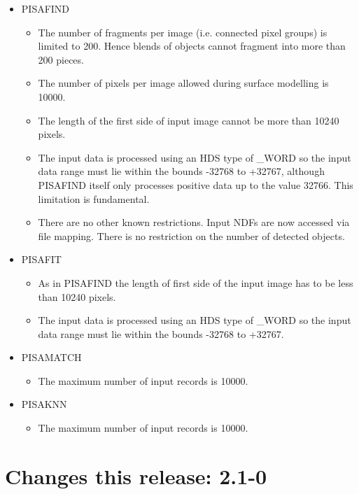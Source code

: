 \begin{itemize}
   \item PISAFIND
   \begin{itemize}
      \item The number of fragments per image (i.e. connected pixel groups)
            is limited to 200. Hence blends of objects cannot fragment into
            more than 200 pieces.
      \item The number of pixels per image allowed during surface modelling
            is 10000. 
      \item The length of the first side of input image cannot be more than
            10240 pixels.
      \item The input data is processed using an HDS type of \_WORD so the input
            data range must lie within the bounds -32768 to +32767,
            although PISAFIND itself only processes positive data up to
            the value 32766. This limitation is fundamental.
      \item There are no other known restrictions. Input NDFs are now accessed
            via file mapping. There is no restriction on the number of detected
            objects.
    \end{itemize}
    \item PISAFIT
    \begin{itemize}
       \item As in PISAFIND the length of first side of the input image
             has to be less than 10240 pixels.
       \item The input data is processed using an HDS type of \_WORD so the input
             data range must lie within the bounds -32768 to +32767.
    \end{itemize}
    \item PISAMATCH
    \begin{itemize}
       \item The maximum number of input records is 10000.
    \end{itemize}
    \item PISAKNN
    \begin{itemize}
       \item The maximum number of input records is 10000.
    \end{itemize}
\end{itemize}

\section{Changes this release: 2.1-0}

